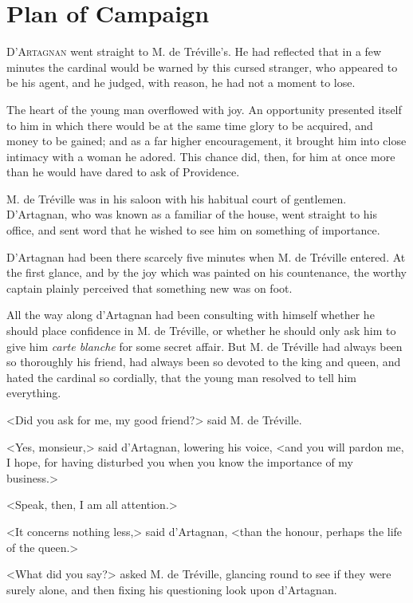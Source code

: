 
\chapter{Plan of Campaign} 
	
\lettrine[]{D}{'Artagnan} went straight to M. de Tréville's. He had reflected that in a few minutes the cardinal would be warned by this cursed stranger, who appeared to be his agent, and he judged, with reason, he had not a moment to lose. 

The heart of the young man overflowed with joy. An opportunity presented itself to him in which there would be at the same time glory to be acquired, and money to be gained; and as a far higher encouragement, it brought him into close intimacy with a woman he adored. This chance did, then, for him at once more than he would have dared to ask of Providence. 

M. de Tréville was in his saloon with his habitual court of gentlemen. D'Artagnan, who was known as a familiar of the house, went straight to his office, and sent word that he wished to see him on something of importance. 

D'Artagnan had been there scarcely five minutes when M. de Tréville entered. At the first glance, and by the joy which was painted on his countenance, the worthy captain plainly perceived that something new was on foot. 

All the way along d'Artagnan had been consulting with himself whether he should place confidence in M. de Tréville, or whether he should only ask him to give him \textit{carte blanche} for some secret affair. But M. de Tréville had always been so thoroughly his friend, had always been so devoted to the king and queen, and hated the cardinal so cordially, that the young man resolved to tell him everything. 

<Did you ask for me, my good friend?> said M. de Tréville. 

<Yes, monsieur,> said d'Artagnan, lowering his voice, <and you will pardon me, I hope, for having disturbed you when you know the importance of my business.> 

<Speak, then, I am all attention.> 

<It concerns nothing less,> said d'Artagnan, <than the honour, perhaps the life of the queen.> 

<What did you say?> asked M. de Tréville, glancing round to see if they were surely alone, and then fixing his questioning look upon d'Artagnan. 

